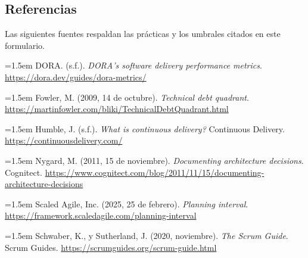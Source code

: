 \documentclass[11pt]{article}
\begin{document}
\subsection{Referencias}\label{t10-referencias}

Las siguientes fuentes respaldan las prácticas y los umbrales citados en este formulario.

\noindent\hangindent=1.5em DORA. (s.f.). \emph{DORA's software delivery performance metrics}. \url{https://dora.dev/guides/dora-metrics/}

\noindent\hangindent=1.5em Fowler, M. (2009, 14 de octubre). \emph{Technical debt quadrant}. \url{https://martinfowler.com/bliki/TechnicalDebtQuadrant.html}

\noindent\hangindent=1.5em Humble, J. (s.f.). \emph{What is continuous delivery?} Continuous Delivery. \url{https://continuousdelivery.com/}

\noindent\hangindent=1.5em Nygard, M. (2011, 15 de noviembre). \emph{Documenting architecture decisions}. Cognitect. \url{https://www.cognitect.com/blog/2011/11/15/documenting-architecture-decisions}

\noindent\hangindent=1.5em Scaled Agile, Inc. (2025, 25 de febrero). \emph{Planning interval}. \url{https://framework.scaledagile.com/planning-interval}

\noindent\hangindent=1.5em Schwaber, K., y Sutherland, J. (2020, noviembre). \emph{The Scrum Guide}. Scrum Guides. \url{https://scrumguides.org/scrum-guide.html}

\ossFinalPage
\end{document}
